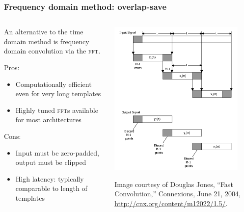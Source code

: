 \documentclass{beamer}
\begin{document}
\begin{frame}
	\frametitle{Frequency domain method: overlap-save}
	\begin{columns}
		\begin{column}{0.5\textwidth}
			An alternative to the time domain method is frequency domain convolution via the \textsc{fft}.

			Pros:
			\begin{itemize}
				\item Computationally efficient even for very long templates
				\item Highly tuned \textsc{fft}s available for most architectures
			\end{itemize}
			Cons:
			\begin{itemize}
				\item Input must be zero-padded, output must be clipped
				\item High latency: typically comparable to length of templates
			\end{itemize}
		\end{column}
		\begin{column}{0.5\textwidth}
			\includegraphics[width=0.9\textwidth]{figures/overlap-save}
			\begin{flushright}
				\scriptsize{Image courtesy of Douglas Jones, ``Fast Convolution,'' Connexions, June 21, 2004, \url{http://cnx.org/content/m12022/1.5/}.}
			\end{flushright}
		\end{column}
	\end{columns}
\end{frame}
\end{document}
